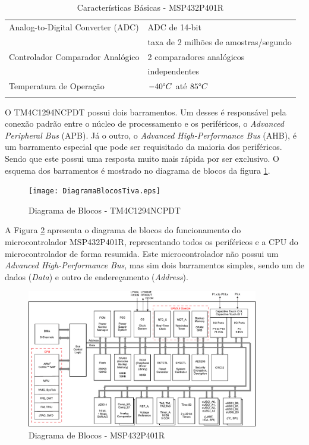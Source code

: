 \begin{longtable}{|l|l|}
	\hline
	Analog-to-Digital Converter (ADC) &  ADC de 14-bit\\
									  & taxa de 2 milhões de amostras/segundo\\
	\hline
	Controlador Comparador Analógico & 2 comparadores analógicos \\
								     & independentes \\
	\hline
	Temperatura de Operação & $-40 \degree C$ até $85 \degree C$ \\
	\hline
	\caption{Características Básicas - MSP432P401R\texttrademark \cite{DATASHEET_MicroMSP}}
	\label{tab:CaracteristicasMicroMSP}
\end{longtable}


O TM4C1294NCPDT possui dois barramentos. Um desses é responsável pela conexão padrão entre o núcleo de processamento e os periféricos, o \emph{Advanced Peripheral Bus} (APB). Já o outro, o \emph{Advanced High-Performance Bus} (AHB), é um barramento especial que pode ser requisitado da maioria dos periféricos. Sendo que este possui uma resposta muito mais rápida por ser exclusivo. O esquema dos barramentos é mostrado no diagrama de blocos da figura \ref{fig:DiagramaBlocosTiva}.


\begin{figure}[H]
\centering
\texttt{[image: DiagramaBlocosTiva.eps]}
    \caption{Diagrama de Blocos - TM4C1294NCPDT \cite{DATASHEET_Tiva}}
    \label{fig:DiagramaBlocosTiva}
\end{figure}

A Figura \ref{fig:DiagramaBlocosMSP432} apresenta o diagrama de blocos do funcionamento do microcontrolador MSP432P401R\texttrademark, representando todos os periféricos e a CPU do microcontrolador de forma resumida.  Este microcontrolador não possui um \emph{Advanced High-Performance Bus}, mas sim dois barramentos simples, sendo um de dados (\emph{Data})  e outro de endereçamento (\emph{Address}). 

\begin{figure}[H]
	\centering
	\includegraphics[width=0.9\textwidth] {figuras/MSP432P401R-Diagrama.pdf}
	\caption{Diagrama de Blocos - MSP432P401R\texttrademark \cite{DATASHEET_MicroMSP}} 
	\label{fig:DiagramaBlocosMSP432}
\end{figure}